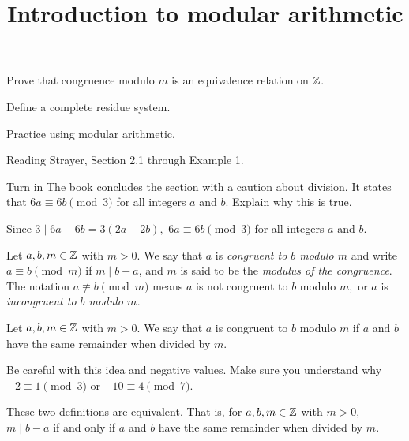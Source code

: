 \documentclass{ximera}
\title{Introduction to modular arithmetic}
\begin{document}
\begin{abstract}
\end{abstract}
\maketitle

\begin{obj}
\item Prove that congruence modulo $m$ is an equivalence relation on $\mathbb Z$.
\item Define a complete residue system.
\item Practice using modular arithmetic.
\end{obj}

\begin{pre}
    \item[Reading] Strayer, Section 2.1 through Example 1.
    \item[Turn in] The book concludes the section with a caution about division. It states that $6a\equiv 6b \pmod 3$ for all integers $a$ and $b$. Explain why this is true.
    
    
    \begin{solution}
        Since $3\mid 6a-6b=3(2a-2b),$ $6a\equiv 6b \pmod 3$ for all integers $a$ and $b$.
    \end{solution}
    \end{pre}




\begin{defn}\label{defn:mod-divides} Let $a,b,m\in\mathbb Z$ with $m>0.$
We say that $a$ is \emph{congruent to $b$ modulo $m$} and write $a \equiv b \pmod{m}$ if $m\mid b-a$, and $m$ is said to be the \emph{modulus of the congruence}. The notation $a\not\equiv b\pmod m$ means $a$ is not congruent to $b$ modulo $m,$ or $a$ is \emph{incongruent to $b$ modulo $m$.} 
\end{defn}

\begin{defn}\label{defn:mod-remainder} Let $a,b,m\in\mathbb Z$ with $m>0.$ We say that $a$ is congruent to $b$ modulo $m$ if $a$ and $b$ have the same remainder when divided by $m$. 
\end{defn}
Be careful with this idea and negative values. Make sure you understand why $-2\equiv 1\pmod{3}$ or $-10\equiv 4\pmod{7}$.

\begin{proposition}\label{prop:mod-defn:equiv}
These two definitions are equivalent. That is, for $a,b,m\in\mathbb Z$ with $m>0,$ $m\mid b-a$ if and only if $a$ and $b$ have the same remainder when divided by $m$.
\end{proposition}
\end{document}
